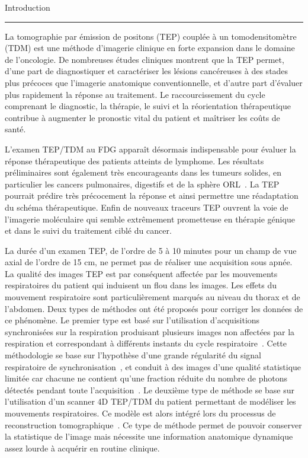 
{\fontsize{30}{100}\selectfont Introduction}

\rule{15cm}{0.1em}

\vspace{1cm}
\pagestyle{plain}

La tomographie par émission de positons (TEP) couplée à un tomodensitomètre (TDM) est une méthode d’imagerie clinique en forte expansion dans le domaine de l’oncologie. De nombreuses études cliniques montrent que la TEP permet, d’une part de diagnostiquer et caractériser les lésions cancéreuses à des stades plus précoces que l’imagerie anatomique conventionnelle, et d’autre part d’évaluer plus rapidement la réponse au traitement. Le raccourcissement du cycle comprenant le diagnostic, la thérapie, le suivi et la réorientation thérapeutique contribue à augmenter le pronostic vital du patient et maîtriser les coûts de santé.

L’examen TEP/TDM au FDG apparaît désormais indispensable pour évaluer la réponse thérapeutique des patients atteints de lymphome. Les résultats préliminaires sont également très encourageants dans les tumeurs solides, en particulier les cancers pulmonaires, digestifs et de la sphère ORL~\cite{cachin2006evaluation}. La TEP pourrait prédire très précocement la réponse et ainsi permettre une réadaptation du schéma thérapeutique. Enfin de nouveaux traceurs TEP ouvrent la voie de l’imagerie moléculaire qui semble extrêmement prometteuse en thérapie génique et dans le suivi du traitement ciblé du cancer.

La durée d’un examen TEP, de l’ordre de 5 à 10 minutes pour un champ de vue axial de l’ordre de 15 cm, ne permet pas de réaliser une acquisition sous apnée. La qualité des images TEP est par conséquent affectée par les mouvements respiratoires du patient qui induisent un flou dans les images. Les effets du mouvement respiratoire sont particulièrement marqués au niveau du thorax et de l’abdomen. Deux types de méthodes ont été proposés pour corriger les données de ce phénomène. Le premier type est basé sur l’utilisation d’acquisitions synchronisées sur la respiration produisant plusieurs images non affectées par la respiration et correspondant à différents instants du cycle respiratoire~\cite{nehmeh2002effect}\cite{boucher2004respiratory}. Cette méthodologie se base sur l’hypothèse  d’une grande régularité du signal respiratoire de synchronisation~\cite{boucher2004respiratory}, et conduit à des images d’une qualité statistique limitée car chacune ne contient qu'une fraction réduite du nombre de photons détectés pendant toute l’acquisition~\cite{visvikis2004evaluation}. Le deuxième type de méthode se base sur l’utilisation d’un scanner 4D TEP/TDM du patient permettant de modéliser les mouvements respiratoires. Ce modèle est alors intégré lors du processus de reconstruction tomographique~\cite{lamare2007list}. Ce type de méthode permet de pouvoir conserver la statistique de l’image mais nécessite une information anatomique dynamique assez lourde à acquérir en routine clinique.

